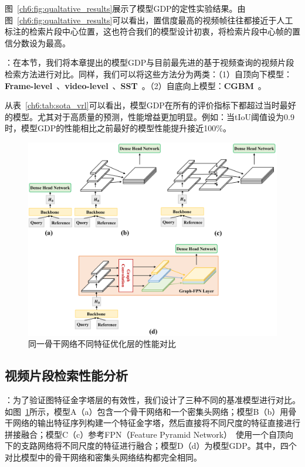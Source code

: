 图~\ref{ch6:fig:qualtative_results}展示了模型GDP的定性实验结果。由图~\ref{ch6:fig:qualtative_results}可以看出，置信度最高的视频帧往往都接近于人工标注的检索片段中心位置，这也符合我们的模型设计初衷，将检索片段中心帧的置信分数设为最高。


\textbf{}：在本节，我们将本章提出的模型GDP与目前最先进的基于视频查询的视频片段检索方法进行对比。同样，我们可以将这些方法分为两类：（1）自顶向下模型：\textbf{Frame-level}~\cite{feng2018video}、\textbf{video-level}~\cite{feng2018video}、\textbf{SST}~\cite{buch2017sst}。（2）自底向上模型：\textbf{CGBM}~\cite{feng2018video}。

从表~\ref{ch6:tab:sota_vrl}可以看出，模型GDP在所有的评价指标下都超过当时最好的模型。尤其对于高质量的预测，性能增益更加明显。例如：当tIoU阈值设为0.9时，模型GDP的性能相比之前最好的模型性能提升接近100\%。


\begin{figure}[tbp]
    \centering
    \includegraphics[width=0.9\linewidth]{chapter6/res/ablative_backbone.pdf}
    \caption{同一骨干网络不同特征优化层的性能对比}
    \label{ch6:fig:ablative_backbone}
\end{figure}


\subsection{视频片段检索性能分析}

\textbf{}：为了验证图特征金字塔层的有效性，我们设计了三种不同的基准模型进行对比。如图~\ref{ch6:fig:ablative_backbone}所示，模型A（a）包含一个骨干网络和一个密集头网络；模型B（b）用骨干网络的输出特征序列构建一个特征金字塔，然后直接将不同尺度的特征直接进行拼接融合；模型C（c）参考FPN（Feature Pyramid Network）~\cite{lin2017feature}使用一个自顶向下的支路网络将不同尺度的特征进行融合；模型D（d）为模型GDP。其中，四个对比模型中的骨干网络和密集头网络结构都完全相同。

